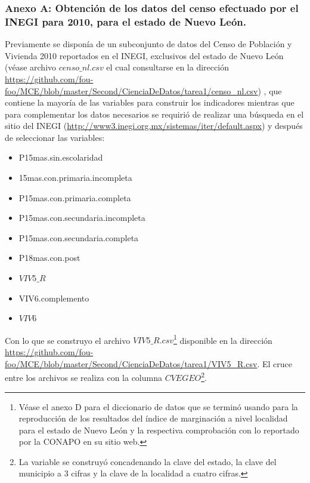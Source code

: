 \documentclass[paper=letter, fontsize=11pt]{scrartcl}
\numberwithin{equation}{section} %
\numberwithin{figure}{section} %
\numberwithin{table}{section} %
\begin{document}
\begin{enumerate}
\begin{enumerate}
\subsubsection{Anexo A: Obtención de los datos del censo efectuado por el INEGI para 2010, para el estado de Nuevo León.}
Previamente se disponía de un subconjunto de datos del Censo de Población y Vivienda 2010 reportados en el INEGI, exclusivos del estado de Nuevo León (véase archivo $censo\_nl.csv$ el cual consultarse en la dirección \url{ https://github.com/fou-foo/MCE/blob/master/Second/CienciaDeDatos/tarea1/censo_nl.csv})  , que contiene la mayoría de las variables para construir los indicadores mientras que para complementar los datos necesarios se requirió de  realizar una búsqueda en el sitio del INEGI (\url{http://www3.inegi.org.mx/sistemas/iter/default.aspx}) y después de seleccionar las variables: 
\begin{itemize}
\item P15mas.sin.escolaridad
\item 15mas.con.primaria.incompleta 
\item P15mas.con.primaria.completa 
\item P15mas.con.secundaria.incompleta
\item P15mas.con.secundaria.completa 
\item P18mas.con.post
\item $VIV5\_R$ 
\item VIV6.complemento 
\item $VIV6$
\end{itemize}
Con lo que se construyo el archivo $VIV5\_R.csv$\footnote{Véase el anexo D para el diccionario de datos que se terminó usando para la reproducción de los resultados del índice de marginación a nivel localidad para el estado de Nuevo León y la respectiva comprobación con lo reportado por la CONAPO en su sitio web.} disponible en la dirección \url{https://github.com/fou-foo/MCE/blob/master/Second/CienciaDeDatos/tarea1/VIV5_R.csv}. El cruce entre los archivos se realiza con la columna $CVEGEO$\footnote{La variable se construyó concadenando la clave del estado, la clave del municipio a 3 cifras y la clave de la localidad a cuatro cifras.}.

\end{enumerate}
\end{enumerate}
\end{document}
